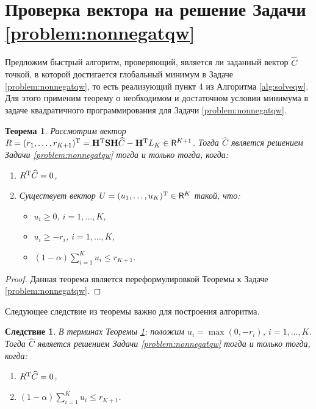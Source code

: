 \documentclass[10pt]{article}
\newtheorem{corollary}{Следствие}
\newtheorem{theorem}{Теорема}
\begin{document}
\section{Проверка вектора на решение Задачи \ref{problem:nonnegatqw}} \label{sect:check}
Предложим быстрый алгоритм, проверяющий, является ли заданный вектор $\widehat C$ точкой, в которой достигается глобальный минимум в Задаче \ref{problem:nonnegatqw}, то есть реализующий пункт 4 из Алгоритма \ref{alg:solveqw}. Для этого применим теорему о необходимом и достаточном условии минимума в задаче квадратичного программирования для Задачи \ref{problem:nonnegatqw}.
\begin{theorem} \label{th:nonnegatfc}
	Рассмотрим вектор $R = (r_1, \ldots, r_{K+1})^{\mathrm{T}} = \mathbf{H}^{\mathrm{T}} \mathbf{S} \mathbf{H} \widehat C - \mathbf{H}^{\mathrm{T}} L_K \in \mathsf{R}^{K+1}$. Тогда $\widehat C$ является решением Задачи \ref{problem:nonnegatqw} тогда и только тогда, когда:
	\begin{enumerate}
		\item $R^{\mathrm{T}} \widehat C = 0$,
		\item Существует вектор $U = (u_1, \ldots, u_K)^{\mathrm{T}} \in \mathsf{R}^K$ такой, что: \begin{itemize}
			\item $u_i \ge 0$, $i = 1, \ldots, K$,
			\item $u_i \ge -r_i$, $i = 1, \ldots, K$,
			\item $(1 - \alpha) \sum_{i=1}^K u_i \le r_{K+1}$.
		\end{itemize}
	\end{enumerate}
\end{theorem} 
\begin{proof}
	Данная теорема является переформулировкой  Теоремы  \cite[Теорема 9.2]{Gavurin1984} к Задаче \ref{problem:nonnegatqw}.
\end{proof}

Следующее следствие из теоремы важно для построения алгоритма.

\begin{corollary} \label{cor:nonnegatfc}
	В терминах Теоремы \ref{th:nonnegatfc}: положим $u_i = \max(0, -r_i)$, $i = 1, \ldots, K$. Тогда $\widehat C$ является решением Задачи \ref{problem:nonnegatqw} тогда и только тогда, когда:
	\begin{enumerate}
		\item $R^{\mathrm{T}} \widehat C = 0$,
		\item $(1 - \alpha) \sum_{i=1}^K u_i \le r_{K+1}$.
	\end{enumerate}
\end{corollary}
\end{document}
